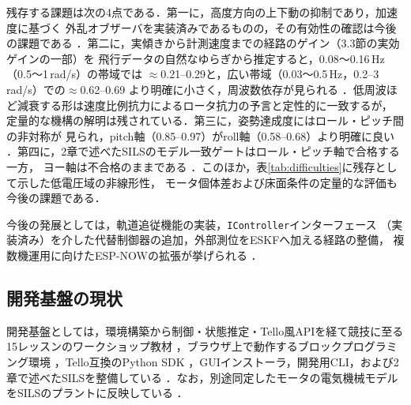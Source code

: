 \documentclass[a4paper,twocolumn,10pt]{ltjsarticle}
\begin{document}
残存する課題は次の4点である．第一に，高度方向の上下動の抑制であり，加速度に基づく
外乱オブザーバを実装済みであるものの，その有効性の確認は今後の課題である
．第二に，実傾きから計測速度までの経路のゲイン（3.3節の実効ゲインの一部）を
飛行データの自然なゆらぎから推定すると，0.08〜0.16\,Hz（0.5〜1\,rad/s）の帯域では
$\approx$0.21--0.29と，広い帯域（0.03〜0.5\,Hz，0.2--3\,rad/s）での$\approx$0.62--0.69
より明確に小さく，周波数依存が見られる
．低周波ほど減衰する形は速度比例抗力によるロータ抗力の予言と定性的に一致するが，
定量的な機構の解明は残されている．第三に，姿勢達成度にはロール・ピッチ間の非対称が
見られ，pitch軸（0.85--0.97）がroll軸（0.58--0.68）より明確に良い
．第四に，2章で述べたSILSのモデル一致ゲートはロール・ピッチ軸で合格する一方，
ヨー軸は不合格のままである
．このほか，表\ref{tab:difficulties}に残存として示した低電圧域の非線形性，
モータ個体差および床面条件の定量的な評価も今後の課題である．

今後の発展としては，軌道追従機能の実装，\texttt{IController}インターフェース
（実装済み）を介した代替制御器の追加，外部測位をESKFへ加える経路の整備，
複数機運用に向けたESP-NOWの拡張が挙げられる
．

\subsection{開発基盤の現状}

開発基盤としては，環境構築から制御・状態推定・Tello風APIを経て競技に至る
15レッスンのワークショップ教材
，ブラウザ上で動作するブロックプログラミング環境
，Tello互換のPython SDK
，GUIインストーラ，開発用CLI，および2章で述べたSILSを整備している
．なお，別途同定したモータの電気機械モデルをSILSのプラントに反映している
．

\end{document}
